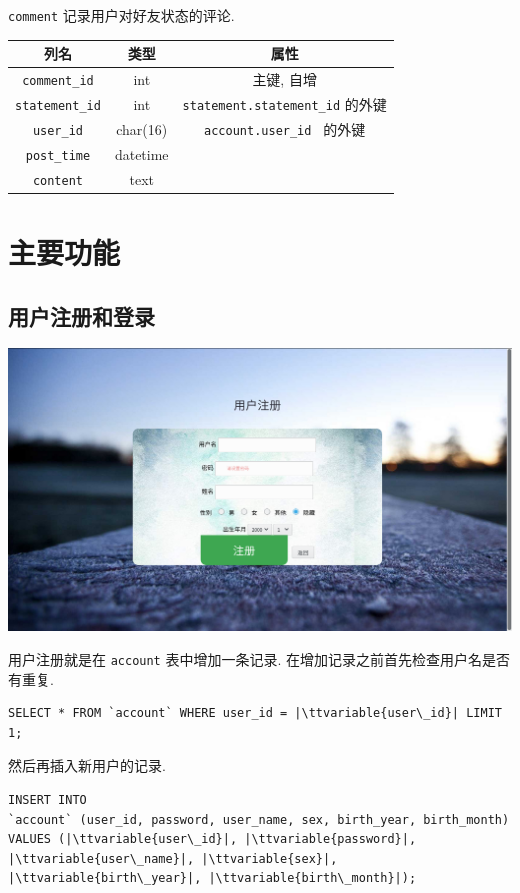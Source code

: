 \documentclass[a4paper,10pt]{article}
\newcommand{\ttvariable}[1]{\texttt{\textit{#1}}}
\begin{document}
\texttt{comment} 记录用户对好友状态的评论.
\begin{center}
	\begin{tabular}{ccc} \hline 
		列名 & 类型 & 属性 \\ \hline
		\texttt{comment_id} & int & 主键, 自增 \\
		\texttt{statement_id} & int & \texttt{statement.statement_id} 的外键 \\
		\texttt{user_id} & char(16) & \texttt{account.user_id } 的外键 \\
		\texttt{post_time} &datetime & \\
		\texttt{content} & text & \\ \hline
	\end{tabular}
\end{center}

\section{主要功能}

\subsection{用户注册和登录}

\begin{center}
	\includegraphics[scale=0.25]{register.png}
\end{center}

用户注册就是在 \texttt{account} 表中增加一条记录. 在增加记录之前首先检查用户名是否有重复.
\begin{verbatim}
SELECT * FROM `account` WHERE user_id = |\ttvariable{user\_id}| LIMIT 1;
\end{verbatim}
然后再插入新用户的记录.
\begin{verbatim}
INSERT INTO
`account` (user_id, password, user_name, sex, birth_year, birth_month)
VALUES (|\ttvariable{user\_id}|, |\ttvariable{password}|, |\ttvariable{user\_name}|, |\ttvariable{sex}|, |\ttvariable{birth\_year}|, |\ttvariable{birth\_month}|);
\end{verbatim}
\end{document}
